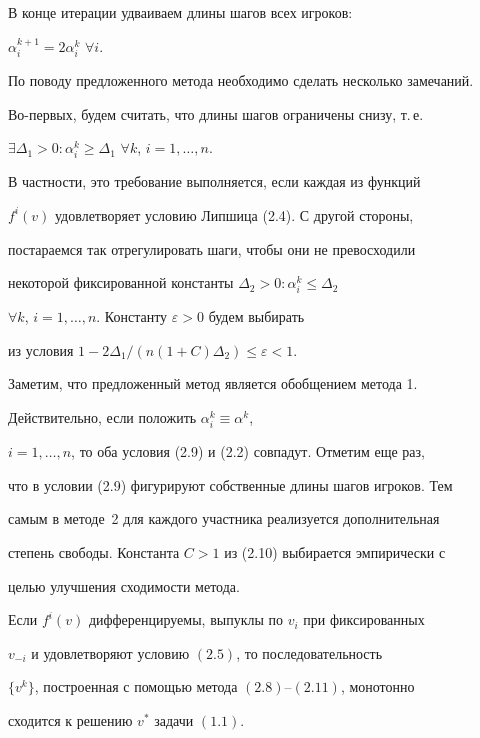 В конце итерации удваиваем длины шагов всех игроков: 


$\alpha^{k+1}_i=2\alpha^k_i$ $\forall i$. 


 


По поводу предложенного метода необходимо сделать несколько замечаний. 


Во-первых, будем считать, что длины шагов ограничены снизу, т.\,е. 


$\exists\Delta_1>0:\alpha^k_i\ge\Delta_1$ $\forall k$, $i=1,\dotsc,n$. 


В частности, это требование выполняется, если каждая из функций 


$f^i(v)$ удовлетворяет условию Липшица (2.4). С другой стороны, 


постараемся так отрегулировать шаги, чтобы они не превосходили 


некоторой фиксированной константы $\Delta_2>0:\alpha^k_i\le\Delta_2$ 


$\forall k$, $i=1,\dotsc,n$. Константу $\varepsilon>0$ будем выбирать 


из условия $1-2\Delta_1/(n(1+C)\Delta_2)\le\varepsilon<1$. 


 


Заметим, что предложенный метод является обобщением метода 1. 


Действительно, если положить $\alpha^k_i\equiv\alpha^k$, 


$i=1,\dotsc,n$, то оба условия (2.9) и (2.2) совпадут. Отметим еще раз, 


что в условии (2.9) фигурируют собственные длины шагов игроков. Тем 


самым в методе~2 для каждого участника реализуется дополнительная 


степень свободы. Константа $C>1$ из (2.10) выбирается эмпирически с 


целью улучшения сходимости метода. 


 


\begin{thm} 


Если $f^i(v)$ дифференцируемы, выпуклы по $v_i$ при фиксированных 


$v_{-i}$ и удовлетворяют условию $(2.5)$, то последовательность 


$\{v^k\}$, построенная с помощью метода $(2.8)$--$(2.11)$, монотонно 


сходится к решению $v^*$ задачи $(1.1)$. 


\end{thm} 


